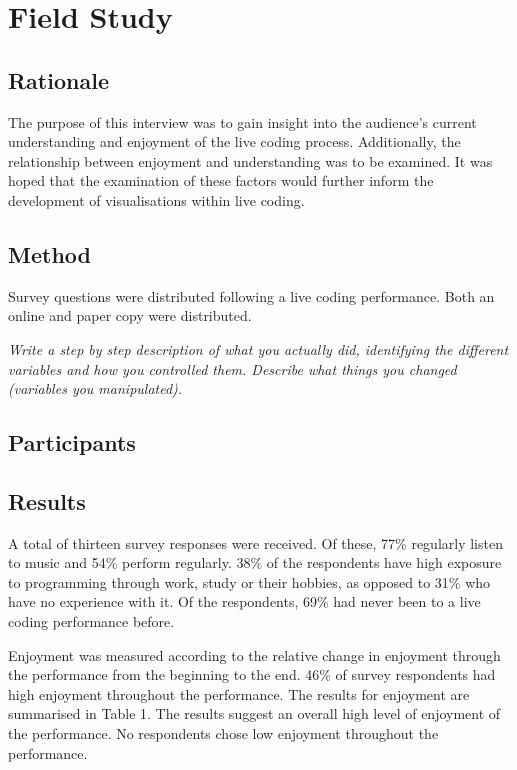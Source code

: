 

\chapter{Field Study}
\label{cha:survey}

\section{Rationale}
\label{sec:fieldstudyrationale}

The purpose of this interview was to gain insight into the audience’s current understanding and enjoyment of the live coding process. Additionally, the relationship between enjoyment and understanding was to be examined. It was hoped that the examination of these factors would further inform the development of visualisations within live coding.

\section{Method}
\label{sec:fieldstudyprocedure}

Survey questions were distributed following a live coding performance. Both an online and paper copy were distributed.

\textit{Write a step by step description of what you actually did, identifying the different variables and how you controlled them. Describe what things you changed (variables you manipulated).}


\section{Participants}
\label{sec:fieldstudyparticipants}



\section{Results}
\label{sec:fieldstudyresults}

A total of thirteen survey responses were received. Of these, 77\% regularly listen to music and 54\% perform regularly. 38\% of the respondents have high exposure to programming through work, study or their hobbies, as opposed to 31\% who have no experience with it. Of the respondents, 69\% had never been to a live coding performance before.

Enjoyment was measured according to the relative change in enjoyment through the performance from the beginning to the end. 46\% of survey respondents had high enjoyment throughout the performance. The results for enjoyment are summarised in Table 1. The results suggest an overall high level of enjoyment of the performance. No respondents chose  low enjoyment throughout the performance.\\


